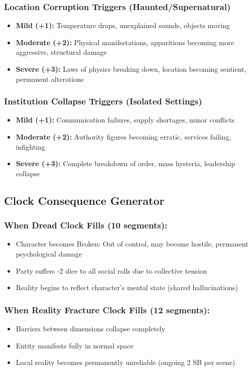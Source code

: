 \documentclass[11pt]{article}
\begin{document}
\subsubsection{Location Corruption Triggers (Haunted/Supernatural)}
\begin{itemize}
\item \textbf{Mild (+1):} Temperature drops, unexplained sounds, objects moving
\item \textbf{Moderate (+2):} Physical manifestations, apparitions becoming more aggressive, structural damage
\item \textbf{Severe (+3):} Laws of physics breaking down, location becoming sentient, permanent alterations
\end{itemize}

\subsubsection{Institution Collapse Triggers (Isolated Settings)}
\begin{itemize}
\item \textbf{Mild (+1):} Communication failures, supply shortages, minor conflicts
\item \textbf{Moderate (+2):} Authority figures becoming erratic, services failing, infighting
\item \textbf{Severe (+3):} Complete breakdown of order, mass hysteria, leadership collapse
\end{itemize}

\subsection{Clock Consequence Generator}

\subsubsection{When Dread Clock Fills (10 segments):}
\begin{itemize}
\item Character becomes Broken: Out of control, may become hostile, permanent psychological damage
\item Party suffers -2 dice to all social rolls due to collective tension
\item Reality begins to reflect character's mental state (shared hallucinations)
\end{itemize}

\subsubsection{When Reality Fracture Clock Fills (12 segments):}
\begin{itemize}
\item Barriers between dimensions collapse completely
\item Entity manifests fully in normal space
\item Local reality becomes permanently unreliable (ongoing 2 SB per scene)
\end{itemize}
\end{document}
